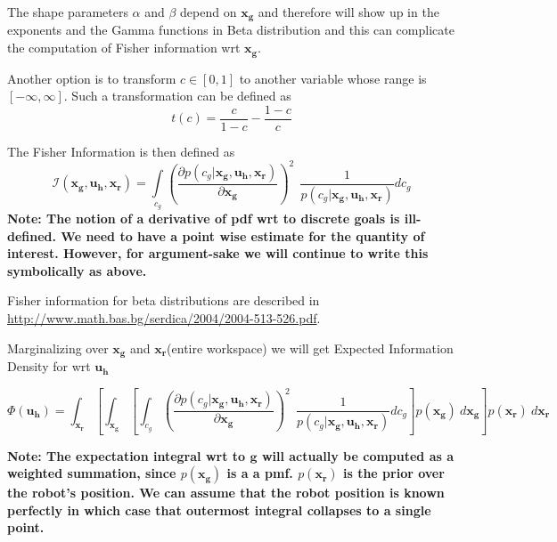 \documentclass[]{article}
\begin{document}
The shape parameters $\alpha$ and $\beta$ depend on $\boldsymbol{x_g}$ and therefore will show up in the exponents and the Gamma functions in Beta distribution and this can complicate the computation of Fisher information wrt $\boldsymbol{x_g}$. 

Another option is to transform $c \in [0,1]$ to another variable whose range is $[-\infty, \infty]$. Such a transformation can be defined as 
\begin{equation*}
t(c) = \frac{c}{1-c} - \frac{1-c}{c}
\end{equation*}

The Fisher Information is then defined as 
\begin{equation*}
\mathcal{I}(\boldsymbol{x_g}, \boldsymbol{u_h}, \boldsymbol{x_r}) = \int\limits_{c_g}^{}\left(\frac{\partial p(c_g | \boldsymbol{x_g}, \boldsymbol{u_h}, \boldsymbol{x_r}) }{\partial \boldsymbol{x_g}}\right)^2~~\frac{1}{p(c_g | \boldsymbol{x_g}, \boldsymbol{u_h}, \boldsymbol{x_r})}dc_g
\end{equation*}
\textbf{Note: The notion of a derivative of pdf wrt to discrete goals is ill-defined. We need to have a point wise estimate for the quantity of interest. However, for argument-sake we will continue to write this symbolically as above.} 

Fisher information for beta distributions are described in \url{http://www.math.bas.bg/serdica/2004/2004-513-526.pdf}. 

Marginalizing over $\boldsymbol{x_g}$ and $\boldsymbol{x_r}$(entire workspace) we will get Expected Information Density for wrt $\boldsymbol{u_h}$

\begin{equation*}
\Phi(\boldsymbol{u_h}) = \int_{\boldsymbol{x_r}}^{}\left[\int_{\boldsymbol{x_g}}^{}\left[\int_{c_g}^{}\left(\frac{\partial p(c_g | \boldsymbol{x_g}, \boldsymbol{u_h}, \boldsymbol{x_r}) }{\partial \boldsymbol{x_g}}\right)^2~~\frac{1}{p(c_g | \boldsymbol{x_g}, \boldsymbol{u_h}, \boldsymbol{x_r})}dc_g\right]p(\boldsymbol{x_g})~d\boldsymbol{x_g}\right]p(\boldsymbol{x_r})~d\boldsymbol{x_r}
\end{equation*}

\textbf{Note: The expectation integral wrt to $\boldsymbol{g}$ will actually be computed as a weighted summation, since $p(\boldsymbol{x_g})$ is a a pmf. $p(\boldsymbol{x_r})$ is the prior over the robot's position. We can assume that the robot position is known perfectly in which case that outermost integral collapses to a single point. }
\end{document}
